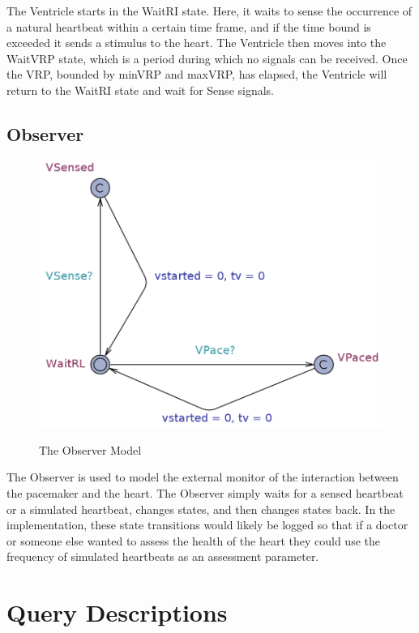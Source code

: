 \documentclass[10pt]{article}
\begin{document}
		The Ventricle starts in the WaitRI state. Here, it waits to sense the occurrence of a natural heartbeat within a certain time frame, and if the time bound is exceeded it sends a stimulus to the heart. The Ventricle then moves into the WaitVRP state, which is a period during which no signals can be received. Once the VRP, bounded by minVRP and maxVRP, has elapsed, the Ventricle will return to the WaitRI state and wait for Sense signals.


	\subsection{Observer}
		\begin{figure}[h]
			\includegraphics[scale=.35]{observer_model.jpg}
			\label{observer_model}
			\centering
			\caption{The Observer Model}
		\end{figure}

		The Observer is used to model the external monitor of the interaction between the pacemaker and the heart. The Observer simply waits for a sensed heartbeat or a simulated heartbeat, changes states, and then changes states back. In the implementation, these state transitions would likely be logged so that if a doctor or someone else wanted to assess the health of the heart they could use the frequency of simulated heartbeats as an assessment parameter.

\section{Query Descriptions}
\end{document}
